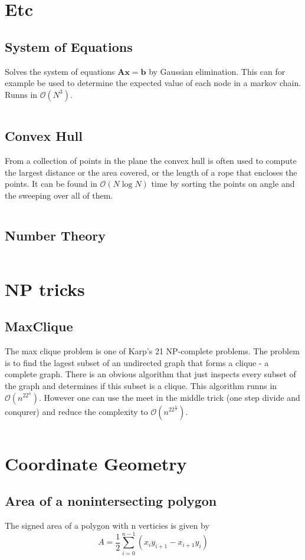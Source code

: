 \documentclass[8pt,a4paper,landscape,oneside]{amsart}
\newcommand{\codej}[1]{\inputminted[fontsize=\large,baselinestretch=1]{java}{code/#1}}
\newcommand{\codep}[1]{\inputminted[fontsize=\large,baselinestretch=1]{py}{code/#1}}
\newcommand{\bigO}{\mathcal{O}}
\begin{document}
\begin{multicols*}{2}
\begin{large}
\section{Etc}
    \subsection{System of Equations}
        Solves the system of equations $\bm{A}\bm{x} = \bm{b}$ by Gaussian elimination. This can for example be used to determine the expected value of each node in a markov chain. Runns in $\bigO (N^3)$.
        \codej{Etc/SolveSystem.java}
    \subsection{Convex Hull}
        From a collection of points in the plane the convex hull is often used to compute the largest distance or the area covered, or the length of a rope that encloses the points. It can be found in $\bigO (N\log{N})$ time by sorting the points on angle and the sweeping over all of them.
        \codej{Etc/ConvexHull.java}
    \subsection{Number Theory}
        \codep{Etc/numbertheory.py}

\section{NP tricks}
    \subsection{MaxClique}
        The max clique problem is one of Karp's 21 NP-complete problems. The problem is to find the lagest subset of an undirected graph that forms a clique - a complete graph. There is an obvious algorithm that just inspects every subset of the graph and determines if this subset is a clique. This algorithm runns in $\bigO(n^22^n)$. However one can use the meet in the middle trick (one step divide and conqurer) and reduce the complexity to $\bigO(n^22^{\frac{n}{2}})$.
        \codej{NP/MaxClique.java}
\section{Coordinate Geometry}
    \subsection{Area of a nonintersecting polygon}
        The signed area of a polygon with n verticies is given by 
        $$A = \frac{1}{2}\sum_{i=0}^{n-1}(x_iy_{i+1} - x_{i+1}y_i)$$

\end{large}
\end{multicols*}
\end{document}
